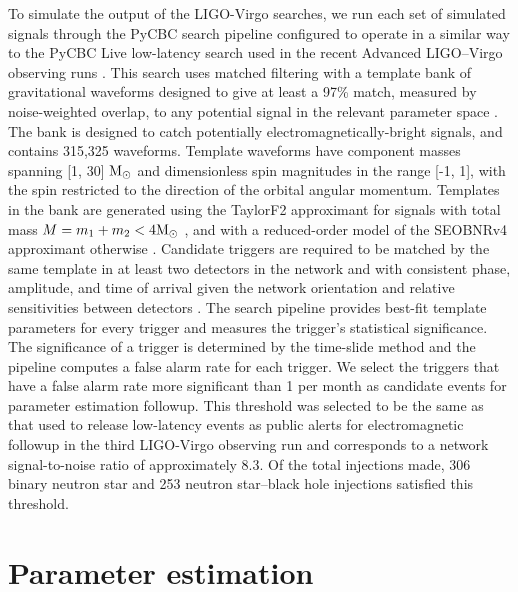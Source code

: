 To simulate the output of the LIGO-Virgo searches, we run each set of simulated signals through the PyCBC search pipeline \cite{Usman:2015kfa} configured to operate in a similar way to the PyCBC Live low-latency search used in the recent Advanced LIGO--Virgo observing runs \cite{DalCanton:2020vpm}. This search uses matched filtering \cite{Allen_2012} with a template bank of gravitational waveforms designed to give at least a 97\% match, measured by noise-weighted overlap, to any potential signal in the relevant parameter space \cite{DalCanton:2017ala,LIGOScientific:2018mvr}. The bank is designed to catch potentially electromagnetically-bright signals, and contains 315,325 waveforms. Template waveforms have component masses spanning [1, 30] $\mathrm{M}_{\odot}$ and dimensionless spin magnitudes in the range [-1, 1], with the spin restricted to the direction of the orbital angular momentum. Templates in the bank are generated using the TaylorF2 approximant for signals with total mass $M=m_{1}+m_{2}< 4\mathrm{M}_{\odot}$ \cite{Faye:2012we}, and with a reduced-order model of the SEOBNRv4 approximant otherwise \cite{Bohe:2016gbl}. Candidate triggers are required to be matched by the same template in at least two detectors in the network and with consistent phase, amplitude, and time of arrival given the network orientation and relative sensitivities between detectors \cite{Nitz:2017svb}. The search pipeline provides best-fit template parameters for every trigger and measures the trigger's statistical significance. The significance of a trigger is determined by the time-slide method and the pipeline computes a false alarm rate for each trigger. We select the triggers that have a false alarm rate more significant than 1 per month as candidate events for parameter estimation followup. This threshold was selected to be the same as that used to release low-latency events as public alerts for electromagnetic followup in the third LIGO-Virgo observing run \cite{emfollowdoc} and corresponds to a network signal-to-noise ratio of approximately $8.3$. Of the total injections made, 306 binary neutron star and 253 neutron star--black hole injections satisfied this threshold.

\section{Parameter estimation}\label{sec:rel_bin_pe}

